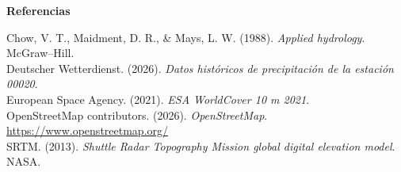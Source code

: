 \documentclass[man]{apa7}
\begin{document}
\begin{flushleft}
\textbf{Referencias}\par
Chow, V. T., Maidment, D. R., \& Mays, L. W. (1988). \textit{Applied hydrology}. McGraw--Hill.\\
Deutscher Wetterdienst. (2026). \textit{Datos históricos de precipitación de la estación 00020}.\\
European Space Agency. (2021). \textit{ESA WorldCover 10 m 2021}.\\
OpenStreetMap contributors. (2026). \textit{OpenStreetMap}. \url{https://www.openstreetmap.org/}\\
SRTM. (2013). \textit{Shuttle Radar Topography Mission global digital elevation model}. NASA.
\end{flushleft}
\end{document}
